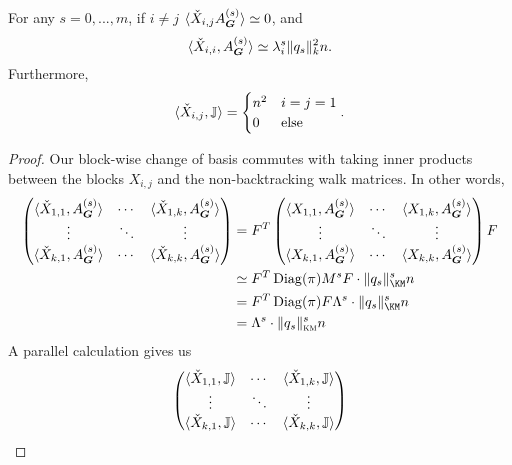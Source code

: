 \begin{lemma}
    For any $s=0,...,m$, if $i\neq j$ $\langle \check X_{i,j} A^{(s)}_{\boldsymbol{G}} \rangle \simeq 0$, and
    $$
        \langle \check X_{i,i}, A^{(s)}_{\boldsymbol{G}} \rangle \simeq \lambda_i^s \|q_s\|^2_{k}n.
    $$
    Furthermore, 
    $$
        \langle \check X_{i,j}, \mathbb{J} \rangle = \begin{cases} n^2 & i=j=1 \\ 0 & \text{else} 
        \end{cases}.
    $$
\end{lemma}

\begin{proof}
    Our block-wise change of basis commutes with taking inner products between the blocks $X_{i,j}$ and the non-backtracking walk matrices. In other words,
    \begin{align*}
        \begin{pmatrix} \langle \check X_{1,1},\nb{s}{\bG}\rangle & \cdots & \langle \check X_{1,k},\nb{s}{\bG}\rangle \\
        \vdots & \ddots & \vdots \\
        \langle \check X_{k,1},\nb{s}{\bG}\rangle & \cdots & \langle \check X_{k,k},\nb{s}{\bG}\rangle 
        \end{pmatrix}
        &= F^T\begin{pmatrix}
        \langle X_{1,1},\nb{s}{\bG}\rangle & \cdots & \langle X_{1,k},\nb{s}{\bG}\rangle \\
        \vdots & \ddots & \vdots \\
        \langle X_{k,1},\nb{s}{\bG}\rangle & \cdots & \langle X_{k,k},\nb{s}{\bG}\rangle 
        \end{pmatrix} F \\
        &\simeq F^T \Diag(\pi)M^s F \cdot \|q_s\|^s_{\KM} n \\
        &= F^T\Diag(\pi)F\Lambda^s \cdot \|q_s\|^s_{\KM}n \\
        &= \Lambda^s \cdot \|q_s\|^s_{\km}n
    \end{align*}
    A parallel calculation gives us 
    \begin{align*}
        \begin{pmatrix} \langle \check X_{1,1},\bbJ\rangle & \cdots & \langle \check X_{1,k},\bbJ\rangle \\
        \vdots & \ddots & \vdots \\
        \langle \check X_{k,1},\bbJ\rangle & \cdots & \langle \check X_{k,k},\bbJ\rangle 
        \end{pmatrix}

\end{align*}
\end{proof}
